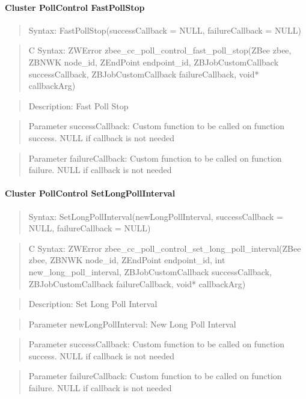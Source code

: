 \paragraph{Cluster PollControl FastPollStop}
\begin{quote}Syntax: FastPollStop(successCallback = NULL, failureCallback = NULL)\end{quote}
\begin{quote}C Syntax: ZWError zbee\_cc\_poll\_control\_fast\_poll\_stop(ZBee zbee, ZBNWK node\_id, ZEndPoint endpoint\_id, ZBJobCustomCallback successCallback, ZBJobCustomCallback failureCallback, void* callbackArg)\end{quote}
\begin{quote}Description: Fast Poll Stop\end{quote}
\begin{quote}Parameter successCallback: Custom function to be called on function success. NULL if callback is not needed\end{quote}
\begin{quote}Parameter failureCallback: Custom function to be called on function failure. NULL if callback is not needed\end{quote}


\paragraph{Cluster PollControl SetLongPollInterval}
\begin{quote}Syntax: SetLongPollInterval(newLongPollInterval, successCallback = NULL, failureCallback = NULL)\end{quote}
\begin{quote}C Syntax: ZWError zbee\_cc\_poll\_control\_set\_long\_poll\_interval(ZBee zbee, ZBNWK node\_id, ZEndPoint endpoint\_id, int new\_long\_poll\_interval, ZBJobCustomCallback successCallback, ZBJobCustomCallback failureCallback, void* callbackArg)\end{quote}
\begin{quote}Description: Set Long Poll Interval\end{quote}
\begin{quote}Parameter newLongPollInterval: New Long Poll Interval\end{quote}
\begin{quote}Parameter successCallback: Custom function to be called on function success. NULL if callback is not needed\end{quote}
\begin{quote}Parameter failureCallback: Custom function to be called on function failure. NULL if callback is not needed\end{quote}


